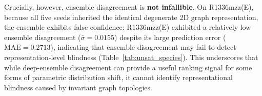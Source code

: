 Crucially, however, ensemble disagreement is \textbf{not infallible}. On R1336mzz(E), because all five seeds inherited the identical degenerate 2D graph representation, the ensemble exhibits false confidence: R1336mzz(E) exhibited a relatively low ensemble disagreement ($\bar{\sigma} = 0.0155$) despite its large prediction error ($\text{MAE} = 0.2713$), indicating that ensemble disagreement may fail to detect representation-level blindness (Table~\ref{tab:unsat_species}). This underscores that while deep-ensemble disagreement can provide a useful ranking signal for some forms of parametric distribution shift, it cannot identify representational blindness caused by invariant graph topologies.
